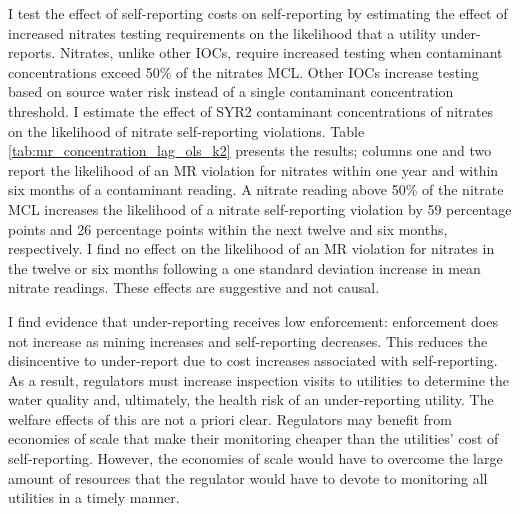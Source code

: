 \documentclass[12pt]{article}
\begin{document}
I test the effect of self-reporting costs on self-reporting by estimating the effect of increased nitrates testing requirements on the likelihood that a utility under-reports. Nitrates, unlike other IOCs, require increased testing when contaminant concentrations exceed 50\% of the nitrates MCL. Other IOCs increase testing based on source water risk instead of a single contaminant concentration threshold. I estimate the effect of SYR2 contaminant concentrations of nitrates on the likelihood of nitrate self-reporting violations. Table \ref{tab:mr_concentration_lag_ols_k2} presents the results; columns one and two report the likelihood of an MR violation for nitrates within one year and within six months of a contaminant reading. A nitrate reading above 50\% of the nitrate MCL increases the likelihood of a nitrate self-reporting violation by 59 percentage points and 26 percentage points within the next twelve and six months, respectively. I find no effect on the likelihood of an MR violation for nitrates in the twelve or six months following a one standard deviation increase in mean nitrate readings. These effects are suggestive and not causal.

I find evidence that under-reporting receives low enforcement: enforcement does not increase as mining increases and self-reporting decreases. This reduces the disincentive to under-report due to cost increases associated with self-reporting. As a result, regulators must increase inspection visits to utilities to determine the water quality and, ultimately, the health risk of an under-reporting utility. The welfare effects of this are not a priori clear. Regulators may benefit from economies of scale that make their monitoring cheaper than the utilities' cost of self-reporting. However, the economies of scale would have to overcome the large amount of resources that the regulator would have to devote to monitoring all utilities in a timely manner.

\end{document}

